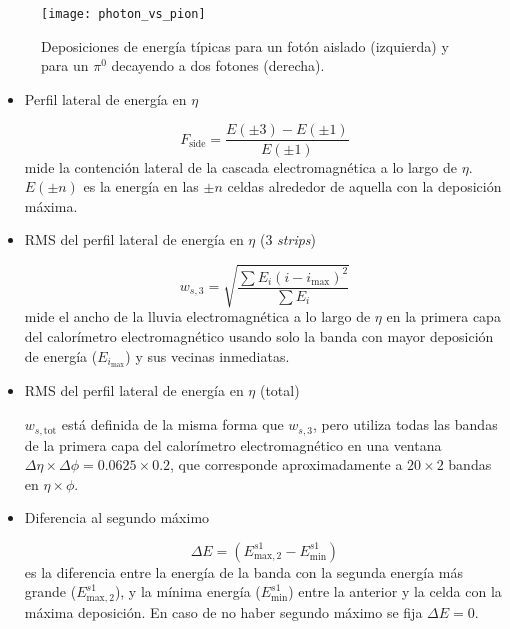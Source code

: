 \begin{figure}[!h]
  \centering

  \texttt{[image: photon\_vs\_pion]}

  \caption{Deposiciones de energía típicas para un fotón aislado (izquierda)
    y para un $\pi^0$ decayendo a dos fotones (derecha).}
  \label{fig:photon_pi0}
\end{figure}




\begin{itemize}\itemsep0.2cm\parskip0.2cm
\item Perfil lateral de energía en $\eta$

  \begin{equation}
    F_\mathrm{side} = \frac{E(\pm 3) - E(\pm 1)}{E(\pm 1)}
  \end{equation}
  mide la contención lateral de la cascada electromagnética a lo largo de $\eta$.
  $E(\pm n)$ es la energía en las $\pm n$ celdas alrededor de aquella con la deposición máxima.

\item RMS del perfil lateral de energía en $\eta$ (3 \emph{strips})

  \begin{equation}
    w_{s,3} = \sqrt{ \frac{\sum E_i (i - i_\mathrm{max})^2}{\sum E_i} }
  \end{equation}
  mide el ancho de la lluvia electromagnética a lo largo de $\eta$ en la primera capa
  del calorímetro electromagnético usando solo la banda con mayor deposición de energía ($E_{i_\mathrm{max}}$)
  y sus vecinas inmediatas.

\item RMS del perfil lateral de energía en $\eta$ (total)

  $w_{s,\mathrm{tot}}$ está definida de la misma forma que $w_{s,3}$, pero utiliza todas las bandas de la
  primera capa del calorímetro electromagnético en una ventana $\Delta\eta \times \Delta\phi = 0.0625 \times 0.2$,
  que corresponde aproximadamente a $20 \times 2$ bandas en $\eta \times \phi$.

\item Diferencia al segundo máximo

  \begin{equation}
    \Delta E = (E^{s1}_{\mathrm{max},2} - E_\mathrm{min}^{s1} )
  \end{equation}
  es la diferencia entre la energía de la banda con la segunda energía más grande ($E^{s1}_{\mathrm{max},2}$),
  y la mínima energía ($E_\mathrm{min}^{s1}$) entre la anterior y la celda con la máxima deposición. En caso
  de no haber segundo máximo se fija $\Delta E = 0$.


\end{itemize}
